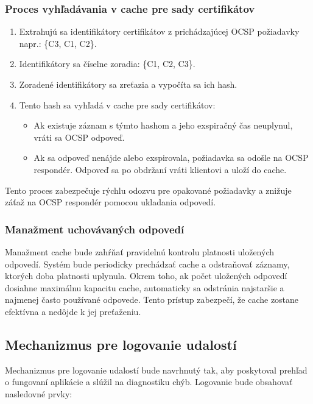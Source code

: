 \documentclass[12pt, twoside]{book}
\begin{document}
\subsubsection{Proces vyhľadávania v cache pre sady certifikátov}
\begin{enumerate}
\item Extrahujú sa identifikátory certifikátov z prichádzajúcej OCSP požiadavky napr.: \{C3, C1, C2\}.
\item Identifikátory sa číselne zoradia: \{C1, C2, C3\}.
\item Zoradené identifikátory sa zreťazia a vypočíta sa ich hash.
\item Tento hash sa vyhľadá v cache pre sady certifikátov:
    \begin{itemize}
    \item Ak existuje záznam s týmto hashom a jeho exspiračný čas neuplynul, vráti sa OCSP odpoveď.
    \item Ak sa odpoveď nenájde alebo exspirovala, požiadavka sa odošle na OCSP respondér. Odpoveď sa po obdržaní vráti klientovi a uloží do cache.
    \end{itemize}
\end{enumerate}

Tento proces zabezpečuje rýchlu odozvu pre opakované požiadavky a znižuje záťaž na OCSP respondér pomocou ukladania odpovedí.

\subsubsection{Manažment uchovávaných odpovedí}
Manažment cache bude zahŕňať pravidelnú kontrolu platnosti uložených odpovedí. Systém bude periodicky prechádzať cache a odstraňovať záznamy, ktorých doba platnosti uplynula. Okrem toho, ak počet uložených odpovedí dosiahne maximálnu kapacitu cache, automaticky sa odstránia najstaršie a najmenej často používané odpovede. Tento prístup zabezpečí, že cache zostane efektívna a nedôjde k jej preťaženiu.  

\subsection{Mechanizmus pre logovanie udalostí}
Mechanizmus pre logovanie udalostí bude navrhnutý tak, aby poskytoval prehľad o fungovaní aplikácie a slúžil na diagnostiku chýb. Logovanie bude obsahovať nasledovné prvky:
\end{document}
